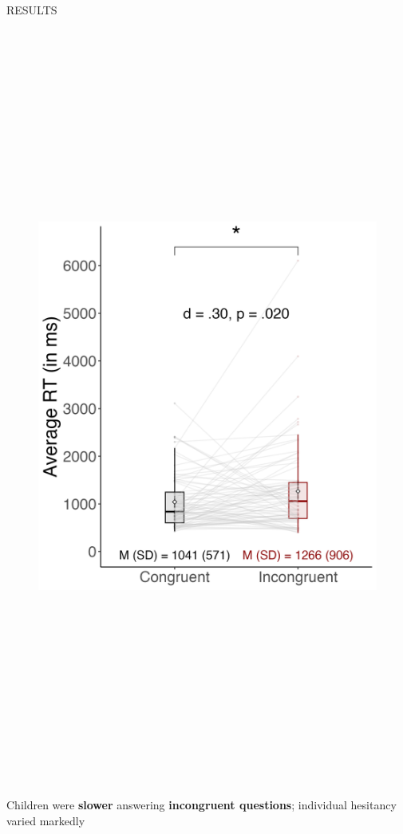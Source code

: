 \documentclass[final]{beamer}
\newlength{\colwidth}
\newlength{\widecolwidth}
\begin{document}
\begin{frame}[t]
\begin{columns}[t]
\begin{column}{\widecolwidth}
\begin{block}{RESULTS}
\begin{minipage}{0.5\textwidth}
\centering
    \begin{figure}
      \includegraphics[height=25cm]{plots/figure2.png}
    \end{figure}
    Children were \textbf{slower} answering \textbf{incongruent questions}; individual hesitancy varied markedly\\

\end{minipage}
\end{block}
\end{column}
\end{columns}
\end{frame}
\end{document}
